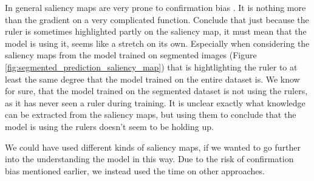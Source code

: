 In general saliency maps are very prone to confirmation bias \cite{sanity-checks-for-saliency,Grns2020FaithfulSM}.
It is nothing more than the gradient on a very complicated function.
Conclude that just because the ruler is sometimes highlighted partly on the saliency map,
it must mean that the model is using it, seems like a stretch on its own.
Especially when considering the saliency maps from the model trained on segmented images (Figure 
\ref{fig:segmented_prediction_saliency_map}) that is hightlighting the ruler to at least the same degree 
that the model trained on the entire dataset is.
We know for sure, that the model trained on the segmented dataset is not using the rulers,
as it has never seen a ruler during training.
It is unclear exactly what knowledge can be extracted from the saliency maps,
but using them to conclude that the model is using the rulers doesn't seem to be holding up.

We could have used different kinds of saliency maps, if we wanted to go further into the understanding 
the model in this way.
Due to the risk of confirmation bias mentioned earlier, we instead used the time on other approaches.
